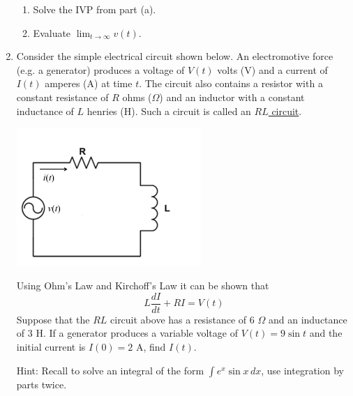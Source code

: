 \documentclass[12pt]{article}
\newif\ifans
\begin{document}
\begin{enumerate}
\begin{enumerate}
\item Solve the IVP from part (a).  

\ifans{\fbox{$v(t)=-\frac{gm}{k}+\left(v_0+\frac{gm}{k}\right)e^{-kt/m}$}} \fi

\item Evaluate $\lim_{t \rightarrow \infty}{v(t)}$.

\ifans{\fbox{\parbox{1\linewidth}{$\lim_{t \rightarrow \infty}{v(t)} = -\frac{gm}{k}$.  This is known as the \underline{terminal velocity} of the object and occurs when the opposing forces of air resistance 
and gravity are equal, causing the object to experience no acceleration.}}} \fi

\end{enumerate}

\item Consider the simple electrical circuit shown below.  An electromotive force (e.g. a generator) produces a voltage of $V(t)$ volts (V) and a current of $I(t)$ amperes (A) at time $t$.  The circuit also contains a resistor 
with a constant resistance of $R$ ohms ($\Omega$) and an inductor with a constant inductance of $L$ henries (H).  Such a circuit is called an \underline{$RL$ circuit}. 

\includegraphics[width=7cm]{RL_circuit}

Using Ohm's Law and Kirchoff's Law it can be shown that $$L\frac{dI}{dt}+RI=V(t)$$  Suppose that the $RL$ circuit above has a resistance of $6$ $  \Omega$ and an inductance of $3$ H.  If a generator produces a variable voltage 
of $V(t)=9\sin{t}$ and the initial current is $I(0) = 2$ A,  find $I(t)$.

Hint: Recall to solve an integral of the form $\int e^x \sin{x} \,dx$, use integration by parts twice.

\ifans{\fbox{$I(t)=-\frac{3}{5}\cos{t}+\frac{6}{5}\sin{t}+\frac{13}{5}e^{-2t}$}} \fi




\end{enumerate}
\end{document}
